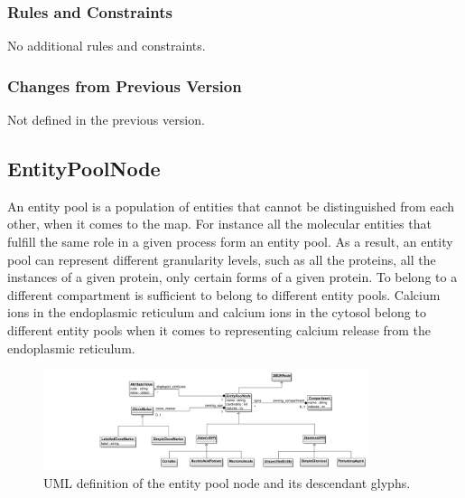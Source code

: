\subsubsection{Rules and Constraints}

No additional rules and constraints.

\subsubsection{Changes from Previous Version}

Not defined in the previous version.


\subsection{EntityPoolNode}
\label{sec:EPNs}\label{defn:EntityPoolNode}\label{sec:EPN}

An entity pool is a population of entities that cannot be
distinguished from each other, when it comes to the \SBGNPDLone
map. For instance all the molecular entities that fulfill the same
role in a given process form an entity pool. As a result, an entity
pool can represent different granularity levels, such as all the
proteins, all the instances of a given protein, only certain forms of
a given protein. To belong to a different compartment is sufficient to
belong to different entity pools. Calcium ions in the endoplasmic
reticulum and calcium ions in the cytosol belong to different entity
pools when it comes to representing calcium release from the
endoplasmic reticulum.


\begin{figure}[htb]
  \centering
  \includegraphics[width=0.85\textwidth]{images/epnuml}
\caption{UML definition of the entity pool node and its descendant glyphs.}
  \label{fig:epnuml}
\end{figure}
 
